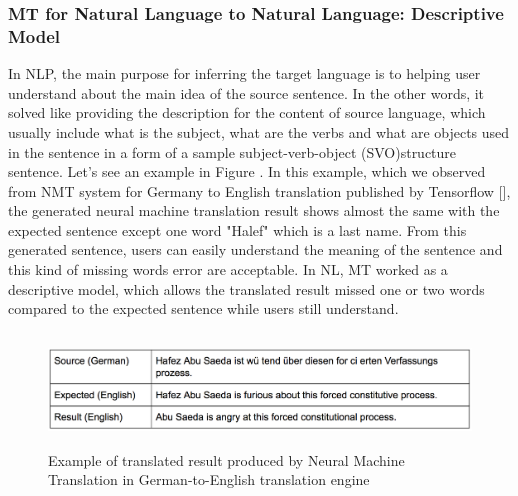 \subsubsection{MT for Natural Language to Natural Language: Descriptive Model}
In NLP, the main purpose for inferring the target language is to helping user understand about the main idea of the source sentence. In the other words, it solved like providing the description for the content of source language, which usually include what is the subject, what are the verbs and what are objects used in the sentence in a form of a sample subject-verb-object (SVO)structure sentence. Let's see an example in Figure \cite{}. In this example, which we observed from NMT system for Germany to English translation published by Tensorflow [\cite{luong17}], the generated neural machine translation result shows almost the same with the expected sentence except one word "Halef" which is a last name. From this generated sentence, users can easily understand the meaning of the sentence and this kind of missing words error are acceptable. In NL, MT worked as a descriptive model, which allows the translated result missed one or two words compared to the expected sentence while users still understand. 
\begin{figure}[htp]
	\centering
	\includegraphics[width=14cm,height=3cm]{resources/fig_nmt_nl_example.png}
	\caption[Example of translated result produced by Neural Machine Translation in German-to-English translation engine] {Example of translated result produced by Neural Machine Translation in German-to-English translation engine}
	\label{fig:NLNMTExample}
\end{figure}

